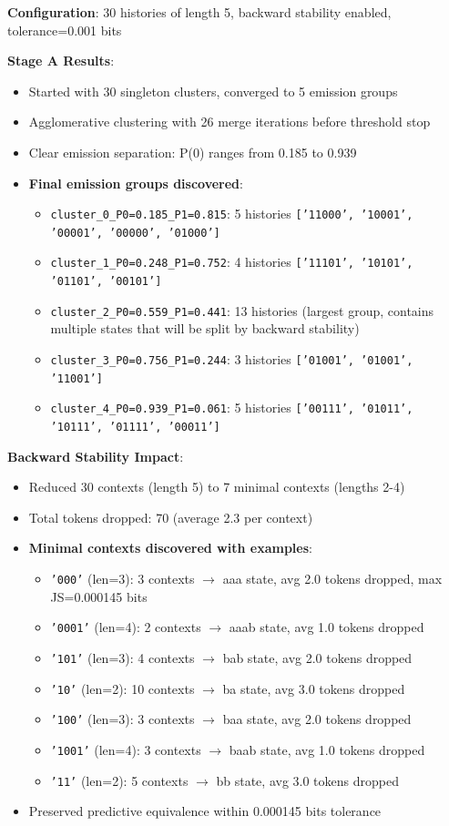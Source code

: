 \documentclass[11pt]{article}
\begin{document}
\begin{resultbox}
\textbf{Configuration}: 30 histories of length 5, backward stability enabled, tolerance=0.001 bits

\textbf{Stage A Results}:
\begin{itemize}
\item Started with 30 singleton clusters, converged to 5 emission groups
\item Agglomerative clustering with 26 merge iterations before threshold stop
\item Clear emission separation: P(0) ranges from 0.185 to 0.939
\item \textbf{Final emission groups discovered}:
  \begin{itemize}
  \item \texttt{cluster\_0\_P0=0.185\_P1=0.815}: 5 histories \texttt{['11000', '10001', '00001', '00000', '01000']}
  \item \texttt{cluster\_1\_P0=0.248\_P1=0.752}: 4 histories \texttt{['11101', '10101', '01101', '00101']}
  \item \texttt{cluster\_2\_P0=0.559\_P1=0.441}: 13 histories (largest group, contains multiple states that will be split by backward stability)
  \item \texttt{cluster\_3\_P0=0.756\_P1=0.244}: 3 histories \texttt{['01001', '01001', '11001']}
  \item \texttt{cluster\_4\_P0=0.939\_P1=0.061}: 5 histories \texttt{['00111', '01011', '10111', '01111', '00011']}
  \end{itemize}
\end{itemize}

\textbf{Backward Stability Impact}:
\begin{itemize}
\item Reduced 30 contexts (length 5) to 7 minimal contexts (lengths 2-4)
\item Total tokens dropped: 70 (average 2.3 per context)
\item \textbf{Minimal contexts discovered with examples}:
  \begin{itemize}
  \item \texttt{'000'} (len=3): 3 contexts $\rightarrow$ aaa state, avg 2.0 tokens dropped, max JS=0.000145 bits
  \item \texttt{'0001'} (len=4): 2 contexts $\rightarrow$ aaab state, avg 1.0 tokens dropped
  \item \texttt{'101'} (len=3): 4 contexts $\rightarrow$ bab state, avg 2.0 tokens dropped
  \item \texttt{'10'} (len=2): 10 contexts $\rightarrow$ ba state, avg 3.0 tokens dropped
  \item \texttt{'100'} (len=3): 3 contexts $\rightarrow$ baa state, avg 2.0 tokens dropped
  \item \texttt{'1001'} (len=4): 3 contexts $\rightarrow$ baab state, avg 1.0 tokens dropped
  \item \texttt{'11'} (len=2): 5 contexts $\rightarrow$ bb state, avg 3.0 tokens dropped
  \end{itemize}
\item Preserved predictive equivalence within 0.000145 bits tolerance
\end{itemize}


\end{resultbox}
\end{document}
